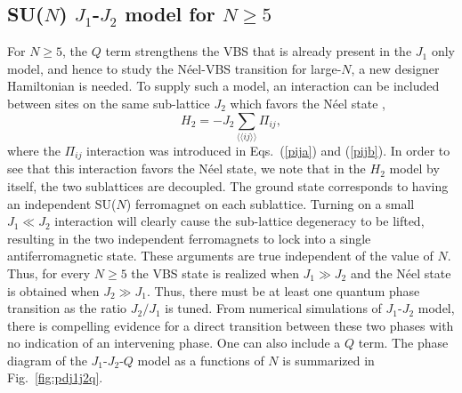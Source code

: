 \documentclass[range]{ar2e}
\begin{document}
\subsection{SU($N$) $J_1$-$J_2$ model for $N\geq 5$}
\label{ss:j1j2N}

For $N\geq 5$, the $Q$ term strengthens the VBS that is already present in the $J_1$ only model, and hence to study the N\'eel-VBS transition 
for large-$N$, a new designer Hamiltonian is needed. To supply such a model, an interaction can be included
between sites on the same sub-lattice $J_2$ which favors the N\'eel state \cite{kaul2011:j1j2},
\begin{equation}
H_{2}= -J_2 \sum_{\langle\langle ij\rangle\rangle} \Pi_{ij},
\end{equation}
where the $\Pi_{ij}$ interaction was introduced in Eqs.~(\ref{pija}) and (\ref{pijb}).
In order to see that this interaction favors the N\'eel state, we note that in the $H_{2}$ model by itself, the two sublattices 
are decoupled. The ground state corresponds to having an independent SU($N$) ferromagnet on each sublattice. Turning on a small $J_1\ll J_2$ 
interaction will clearly cause the sub-lattice degeneracy to be lifted, resulting in the two independent ferromagnets to lock into a single
antiferromagnetic state. These arguments are true independent of the value of $N$. Thus, for every $N\geq 5$ the VBS state is realized when 
$J_1\gg J_2$ and the N\'eel state is obtained when $J_2 \gg J_1$. Thus, there must be at least one quantum phase transition as the ratio
$J_2/J_1$ is tuned. From numerical simulations of $J_1$-$J_2$ model, there is compelling evidence for a direct transition between these two 
phases with no indication of an intervening phase. One can also include a $Q$ term. The phase diagram of the $J_1$-$J_2$-$Q$ model as a functions 
of $N$ is summarized in Fig.~\ref{fig:pdj1j2q}.
\end{document}
